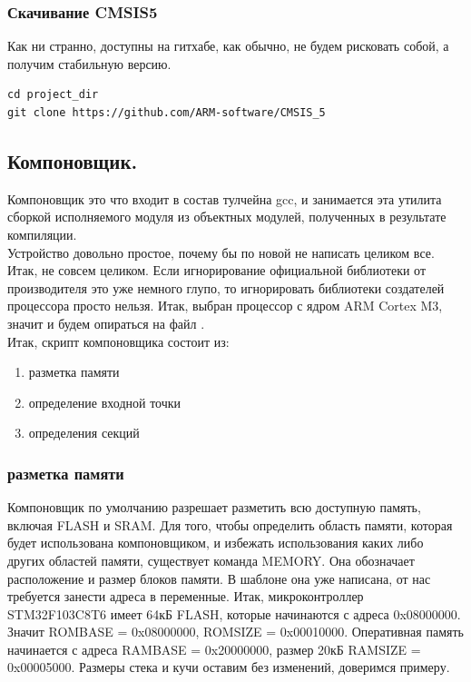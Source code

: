 \documentclass[12pt,a4paper]{article}
\begin{document}
\subsubsection{Скачивание CMSIS5}
    Как ни странно, доступны на гитхабе, как обычно, не будем рисковать
    собой, а получим стабильную версию.
\begin{lstlisting}
cd project_dir
git clone https://github.com/ARM-software/CMSIS_5
\end{lstlisting}


\subsection{Компоновщик.}
    Компоновщик это что входит в состав тулчейна gcc, и занимается эта
    утилита сборкой исполняемого модуля из объектных модулей, полученных в
    результате компиляции.\\
    Устройство довольно простое, почему бы по новой не написать целиком все.
    Итак, не совсем целиком. Если игнорирование официальной библиотеки от
    производителя это уже немного глупо, то игнорировать библиотеки создателей
    процессора просто нельзя. Итак, выбран процессор с ядром ARM Cortex M3,
    значит и будем опираться на файл
    .\\
    Итак, скрипт компоновщика состоит из:
\begin{enumerate}
    \item разметка памяти
    \item определение входной точки
    \item определения секций
\end{enumerate}
\subsubsection{разметка памяти}
    Компоновщик по умолчанию разрешает разметить всю доступную память, включая
    FLASH и SRAM. Для того, чтобы определить область памяти, которая будет
    использована компоновщиком, и избежать использования каких либо других
    областей памяти, существует команда MEMORY. Она
    обозначает расположение и размер блоков памяти. В шаблоне она уже написана,
    от нас требуется занести адреса в переменные.
    Итак, микроконтроллер STM32F103C8T6 имеет 64кБ FLASH, которые начинаются
    с адреса 0x08000000. Значит \textunderscore\textunderscore ROM\textunderscore BASE = 0x08000000, \textunderscore\textunderscore ROM\textunderscore SIZE = 0x00010000.
    Оперативная память начинается с адреса \textunderscore\textunderscore RAM\textunderscore BASE = 0x20000000, размер 20кБ
    \textunderscore\textunderscore RAM\textunderscore SIZE = 0x00005000. Размеры стека и кучи оставим без изменений,
    доверимся примеру.
\end{document}
